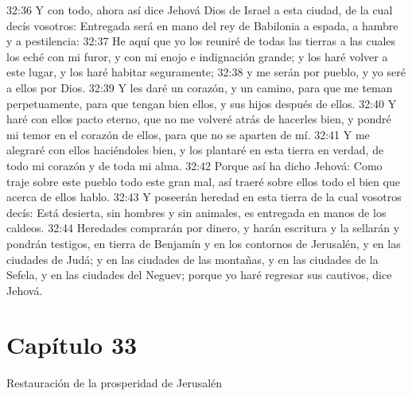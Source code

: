 32:36 Y con todo, ahora así dice Jehová Dios de Israel a esta ciudad, de la cual decís vosotros: Entregada será en mano del rey de Babilonia a espada, a hambre y a pestilencia: 
32:37 He aquí que yo los reuniré de todas las tierras a las cuales los eché con mi furor, y con mi enojo e indignación grande; y los haré volver a este lugar, y los haré habitar seguramente; 
32:38 y me serán por pueblo, y yo seré a ellos por Dios. 
32:39 Y les daré un corazón, y un camino, para que me teman perpetuamente, para que tengan bien ellos, y sus hijos después de ellos. 
32:40 Y haré con ellos pacto eterno, que no me volveré atrás de hacerles bien, y pondré mi temor en el corazón de ellos, para que no se aparten de mí. 
32:41 Y me alegraré con ellos haciéndoles bien, y los plantaré en esta tierra en verdad, de todo mi corazón y de toda mi alma. 
32:42 Porque así ha dicho Jehová: Como traje sobre este pueblo todo este gran mal, así traeré sobre ellos todo el bien que acerca de ellos hablo. 
32:43 Y poseerán heredad en esta tierra de la cual vosotros decís: Está desierta, sin hombres y sin animales, es entregada en manos de los caldeos. 
32:44 Heredades comprarán por dinero, y harán escritura y la sellarán y pondrán testigos, en tierra de Benjamín y en los contornos de Jerusalén, y en las ciudades de Judá; y en las ciudades de las montañas, y en las ciudades de la Sefela, y en las ciudades del Neguev; porque yo haré regresar sus cautivos, dice Jehová. 
\section*{Capítulo 33 }
Restauración de la prosperidad de Jerusalén 
 
